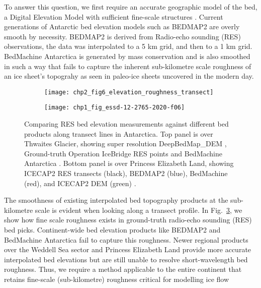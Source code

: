 To answer this question, we first require an accurate geographic model of the bed, a Digital Elevation Model with sufficient fine-scale structures \citep[Chp.~\ref{ch:2},][]{LeongDeepBedMapdeepneural2020}. Current generations of Antarctic bed elevation models such as BEDMAP2 \citep{FretwellBedmap2improvedice2013} are overly smooth by necessity.
BEDMAP2 is derived from Radio-echo sounding (\gls{RES}) observations, the data was interpolated to a 5 km grid, and then to a 1 km grid.
BedMachine Antarctica \citep{MorlighemMEaSUREsBedMachineAntarctica2020} is generated by mass conservation and is also smoothed in such a way that fails to capture the inherent sub-kilometre scale roughness of an ice sheet's topograhy as seen in paleo-ice sheets uncovered in the modern day.

\begin{figure}[htbp]
  \centering
  \begin{subfigure}[t]{0.65\textwidth}
    \texttt{[image: chp2\_fig6\_elevation\_roughness\_transect]}
    \label{fig:1.2a}
  \end{subfigure}
  \vfill
  \begin{subfigure}[t]{0.65\textwidth}
    \texttt{[image: chp1\_fig\_essd-12-2765-2020-f06]}
    \label{fig:1.2b}
  \end{subfigure}
  \caption[Comparison of bed elevation products along ground-truth transects]{
    Comparing \gls{RES} bed elevation measurements against different bed products along transect lines in Antarctica.
    Top panel is over Thwaites Glacier, showing super resolution DeepBedMap\_DEM \citep[purple;][]{LeongDeepBedMapdeepneural2020}, Ground-truth Operation IceBridge \gls{RES} points \citep[orange;][]{ShiMultichannelCoherentRadar2010} and BedMachine Antarctica \citep[green;][]{MorlighemDeepglacialtroughs2019}.
    Bottom panel is over Princess Elizabeth Land, showing ICECAP2 \gls{RES} transects (black), BEDMAP2 (blue), BedMachine (red), and ICECAP2 DEM (green) \citep[Fig. 6 from][]{CuiBedtopographyPrincess2020}.
  }
  \label{fig:1.2}
\end{figure}

The smoothness of existing interpolated bed topography products at the sub-kilometre scale is evident when looking along a transect profile.
In Fig.~\ref{fig:1.2}, we show how fine scale roughness exists in ground-truth radio-echo sounding (\gls{RES}) bed picks.
Continent-wide bed elevation products like BEDMAP2 and BedMachine Antarctica fail to capture this roughness.
Newer regional products over the Weddell Sea sector \citep{Jeofrynewbedelevation2018} and Princess Elizabeth Land \citep{CuiBedtopographyPrincess2020} provide more accurate interpolated bed elevations but are still unable to resolve short-wavelength bed roughness.
Thus, we require a method applicable to the entire continent that retains fine-scale (sub-kilometre) roughness critical for modelling ice flow \citep[see e.g.][]{HubbardSpectralroughnessglaciated2000,SiegertMacroscalebedroughness2004,BinghamDiverselandscapesPine2017,FalciniQuantifyingbedroughness2018}

